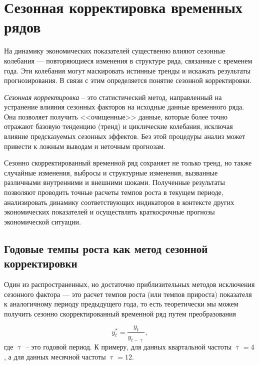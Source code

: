 \documentclass[a4paper, 14pt]{extreport}
\numberwithin{equation}{section}
\renewcommand{\tau}{\uptau}
\numberwithin{equation}{section}
\begin{document}
	
	
	
	
	
	\section{Сезонная корректировка временных рядов}
	На динамику экономических показателей существенно влияют сезонные колебания --- повторяющиеся изменения в структуре ряда, связанные с временем года. Эти колебания могут маскировать истинные тренды и искажать результаты прогнозирования. В связи с этим определяется понятие сезонной корректировки. 
	
	\textit{Сезонная корректировка} -- это статистический метод, направленный на устранение влияния сезонных факторов на исходные данные временного ряда. Она позволяет получить <<очищенные>> данные, которые более точно отражают базовую тенденцию (тренд) и циклические колебания, исключая влияние предсказуемых сезонных эффектов. Без этой процедуры анализ может привести к ложным выводам и неточным прогнозам.
	
	Сезонно скорректированный временной ряд сохраняет не только тренд, но также случайные изменения, выбросы и структурные изменения, вызванные различными внутренними и внешними шоками. Полученные результаты позволяют проводить точные расчеты темпов роста в текущем периоде, анализировать динамику соответствующих индикаторов в контексте других экономических показателей и осуществлять краткосрочные прогнозы экономической ситуации.
	
	\subsection{Годовые темпы роста как метод сезонной корректировки}
	\label{subsec:pcy}
	
	Один из распространенных, но достаточно приблизительных методов исключения сезонного фактора --- это расчет темпов роста (или темпов прироста) показателя к аналогичному периоду предыдущего года, то есть теоретически мы можем получить сезонно скорректированный временной ряд путем преобразования
	
	\begin{equation}
		y^*_t = \dfrac{y_t}{y_{t-\tau}},
	\end{equation}
	где $\tau$ -- это годовой период. К примеру, для данных квартальной частоты $\tau = 4$, а для данных месячной частоты $\tau = 12$.
 	
\end{document}
